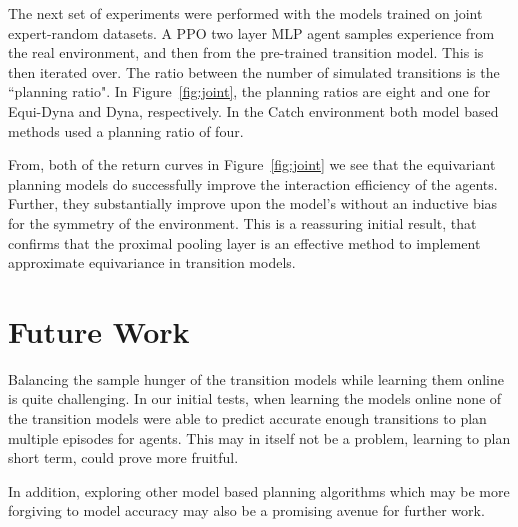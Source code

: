 \documentclass[mlabstract]{jmlr}
\begin{document}
The next set of experiments were performed with the models trained on joint expert-random datasets. A PPO two layer MLP agent samples experience from the real environment, and then from the pre-trained transition model. This is then iterated over. The ratio between the number of simulated transitions is the ``planning ratio". In Figure~\ref{fig:joint}, the planning ratios are eight and one for Equi-Dyna and Dyna, respectively. In the Catch environment both model based methods used a planning ratio of four.

From, both of the return curves in Figure~\ref{fig:joint} we see that the equivariant planning models do successfully improve the interaction efficiency of the agents. Further, they substantially improve upon the model's without an inductive bias for the symmetry of the environment. This is a reassuring initial result, that confirms that the proximal pooling layer is an effective method to implement approximate equivariance in transition models.

\section{Future Work}
Balancing the sample hunger of the transition models while learning them online is quite challenging. In our initial tests, when learning the models online none of the transition models were able to predict accurate enough transitions to plan multiple episodes for agents. This may  in itself not be a problem, learning to plan short term, could prove more fruitful.

In addition, exploring other model based planning algorithms which may be more forgiving to model accuracy may also be a promising avenue for further work.

\newpage




\appendix
\end{document}
